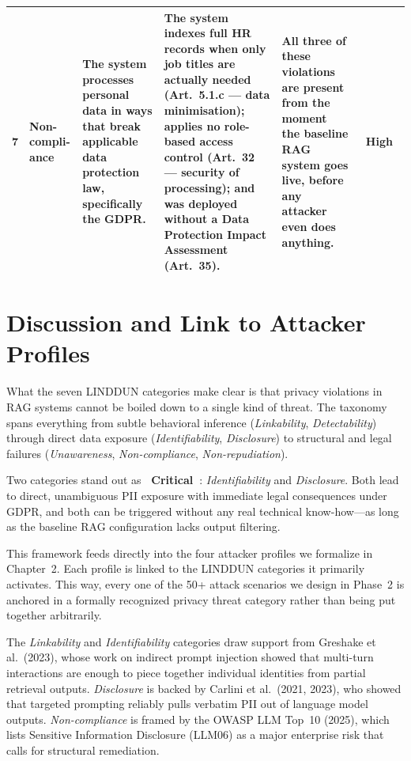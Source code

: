 \documentclass[a4paper,12pt]{report}
\newcommand{\badgecritical}{%
  \colorbox{danger}{\color{white}\small\textbf{~Critical~}}}
\newcommand{\badgehigh}{%
  \colorbox{warn}{\color{white}\small\textbf{~High~}}}
\begin{document}
\begin{longtable}{
    C{0.38cm}
    L{1.85cm}
    L{3.05cm}
    L{3.75cm}
    L{3.25cm}
    C{1.35cm}
  }
  \small 7 &
  \small\textbf{Non-compli-ance} &
  \small The system processes personal data in ways that break applicable
  data protection law, specifically the GDPR. &
  \small The system indexes full HR records when only job titles are actually
  needed (Art.~5.1.c --- data minimisation); applies no role-based access
  control (Art.~32 --- security of processing); and was deployed without a Data
  Protection Impact Assessment (Art.~35). &
  \small All three of these violations are present from the moment
  the baseline RAG system goes live, before any attacker even does anything. &
  \badgehigh \\[4pt]

  \bottomrule
\end{longtable}

\section{Discussion and Link to Attacker Profiles}

What the seven LINDDUN categories make clear is that privacy violations in RAG
systems cannot be boiled down to a single kind of threat. The taxonomy spans
everything from subtle behavioral inference (\emph{Linkability},
\emph{Detectability}) through direct data exposure (\emph{Identifiability},
\emph{Disclosure}) to structural and legal failures (\emph{Unawareness},
\emph{Non-compliance}, \emph{Non-repudiation}).

Two categories stand out as \badgecritical: \emph{Identifiability} and
\emph{Disclosure}. Both lead to direct, unambiguous PII exposure with
immediate legal consequences under GDPR, and both can be triggered without
any real technical know-how---as long as the baseline RAG configuration lacks
output filtering.

This framework feeds directly into the four attacker profiles we formalize in
Chapter~2. Each profile is linked to the LINDDUN categories it primarily
activates. This way, every one of the 50+ attack scenarios we design in Phase~2
is anchored in a formally recognized privacy threat category rather than being
put together arbitrarily.

The \emph{Linkability} and \emph{Identifiability} categories draw support from
Greshake et al.\ (2023), whose work on indirect prompt injection showed
that multi-turn interactions are enough to piece together individual identities
from partial retrieval outputs. \emph{Disclosure} is backed by
Carlini et al.\ (2021, 2023), who showed that targeted prompting reliably
pulls verbatim PII out of language model outputs.
\emph{Non-compliance} is framed by the OWASP LLM Top~10 (2025), which
lists Sensitive Information Disclosure (LLM06) as a major enterprise
risk that calls for structural remediation.
\end{document}
